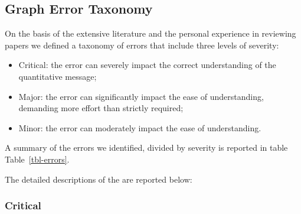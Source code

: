 \documentclass[
  10pt,
  conference,
]{IEEEtran}%
\providecommand{\tightlist}{%
  \setlength{\itemsep}{0pt}\setlength{\parskip}{0pt}}\usepackage{longtable,booktabs,array}
\begin{document}
\subsection{Graph Error Taxonomy}\label{sec-error-taxonomy}

On the basis of the extensive literature and the personal experience in
reviewing papers we defined a taxonomy of errors that include three
levels of severity:

\begin{itemize}
\tightlist
\item
  Critical: the error can severely impact the correct understanding of
  the quantitative message;
\item
  Major: the error can significantly impact the ease of understanding,
  demanding more effort than strictly required;
\item
  Minor: the error can moderately impact the ease of understanding.
\end{itemize}

A summary of the errors we identified, divided by severity is reported
in table Table~\ref{tbl-errors}.

\begin{table}

\caption{\label{tbl-errors}Summary of errors by severity level.}


\end{table}%

The detailed descriptions of the are reported below:

\subsubsection{Critical}\label{critical}
\end{document}
